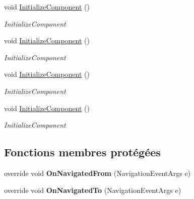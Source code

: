 \begin{DoxyCompactItemize}
void \hyperlink{class_pumgrana_1_1_edit_content_ab92d3ab67131ef0dbdf3f96130bb44a8}{Initialize\+Component} ()
\begin{DoxyCompactList}\small\item\em Initialize\+Component \end{DoxyCompactList}\item 
void \hyperlink{class_pumgrana_1_1_edit_content_ab92d3ab67131ef0dbdf3f96130bb44a8}{Initialize\+Component} ()
\begin{DoxyCompactList}\small\item\em Initialize\+Component \end{DoxyCompactList}\item 
void \hyperlink{class_pumgrana_1_1_edit_content_ab92d3ab67131ef0dbdf3f96130bb44a8}{Initialize\+Component} ()
\begin{DoxyCompactList}\small\item\em Initialize\+Component \end{DoxyCompactList}\item 
void \hyperlink{class_pumgrana_1_1_edit_content_ab92d3ab67131ef0dbdf3f96130bb44a8}{Initialize\+Component} ()
\begin{DoxyCompactList}\small\item\em Initialize\+Component \end{DoxyCompactList}\end{DoxyCompactItemize}
\subsection*{Fonctions membres protégées}
\begin{DoxyCompactItemize}
\item 
\hypertarget{class_pumgrana_1_1_edit_content_a8237fd31bb57264d09279813cd583234}{override void {\bfseries On\+Navigated\+From} (Navigation\+Event\+Args e)}\label{class_pumgrana_1_1_edit_content_a8237fd31bb57264d09279813cd583234}

\item 
\hypertarget{class_pumgrana_1_1_edit_content_a73e992cf89151b155fe56dbd105f4ab7}{override void {\bfseries On\+Navigated\+To} (Navigation\+Event\+Args e)}\label{class_pumgrana_1_1_edit_content_a73e992cf89151b155fe56dbd105f4ab7}

\end{DoxyCompactItemize}


